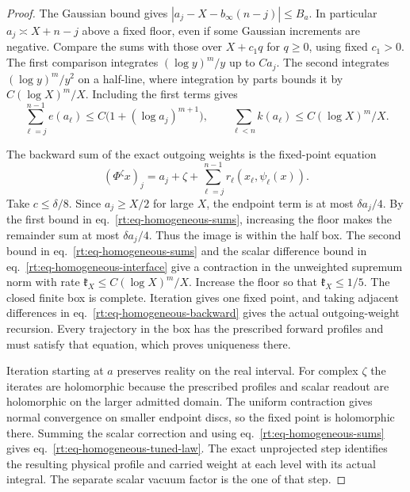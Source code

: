 \documentclass[11pt,letterpaper,reqno]{amsart}
\numberwithin{equation}{section}
\renewcommand{\eqref}[1]{\textup{eq.~\ref{#1}}}
\theoremstyle{definition}
\theoremstyle{remark}
\begin{document}
\begin{proof}
The Gaussian bound gives $|a_j-X-b_\infty(n-j)|\le B_a$. In
particular $a_j\asymp X+n-j$ above a fixed floor, even if some
Gaussian increments are negative. Compare the sums with those
over $X+c_1 q$ for $q\ge0$, using fixed $c_1>0$. The first
comparison integrates $(\log y)^m/y$ up to $C a_j$. The second
integrates $(\log y)^m/y^2$ on a half-line, where integration by
parts bounds it by $C(\log X)^m/X$. Including the first terms gives
\begin{equation}\label{rt:eq-homogeneous-sums}
 \sum_{\ell=j}^{n-1}e(a_\ell)\le C\bigl(1+(\log a_j)^{m+1}\bigr),
 \qquad
 \sum_{\ell<n}k(a_\ell)\le C(\log X)^m/X.
\end{equation}

The backward sum of the exact outgoing weights is the fixed-point
equation
\begin{equation}\label{rt:eq-homogeneous-backward}
   (\Phi^\zeta x)_j=a_j+\zeta+
             \sum_{\ell=j}^{n-1}r_\ell(x_\ell,\psi_\ell(x)).
\end{equation}
Take $c\le\delta/8$. Since $a_j\ge X/2$ for large $X$, the endpoint
term is at most $\delta a_j/4$. By the first bound in
\eqref{rt:eq-homogeneous-sums}, increasing the floor makes the
remainder sum at most $\delta a_j/4$. Thus the image is within the
half box. The second bound in \eqref{rt:eq-homogeneous-sums} and
the scalar difference bound in \eqref{rt:eq-homogeneous-interface}
give a contraction in the unweighted supremum norm with rate
$\mathfrak k_X\le C(\log X)^m/X$. Increase the floor so that
$\mathfrak k_X\le1/5$. The closed finite box is complete. Iteration
gives one fixed point, and taking adjacent differences in
\eqref{rt:eq-homogeneous-backward} gives the actual outgoing-weight
recursion. Every trajectory in the box has the prescribed forward
profiles and must satisfy that equation, which proves uniqueness
there.

Iteration starting at $a$ preserves reality on the real interval.
For complex $\zeta$ the iterates are holomorphic because the
prescribed profiles and scalar readout are holomorphic on the
larger admitted domain. The uniform contraction gives normal
convergence on smaller endpoint discs, so the fixed point is
holomorphic there. Summing the scalar correction and using
\eqref{rt:eq-homogeneous-sums} gives \eqref{rt:eq-homogeneous-tuned-law}.
The exact unprojected step identifies the resulting physical
profile and carried weight at each level with its actual integral.
The separate scalar vacuum factor is the one of that step.


\end{proof}
\end{document}
